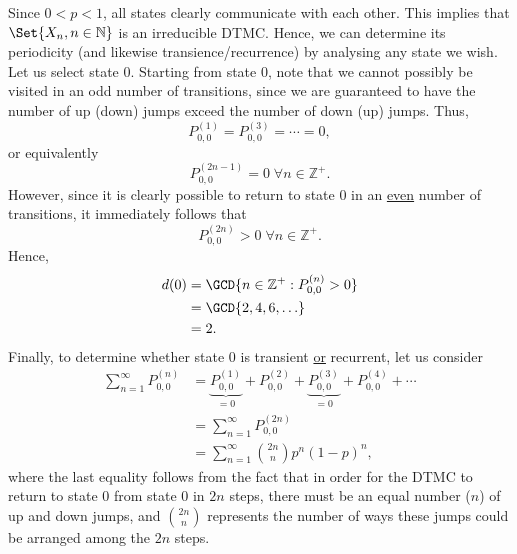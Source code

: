 \begin{Example}
    Since $ 0<p<1 $, all states clearly communicate with
    each other. This implies that $ \Set{X_n,n\in\mathbb{N}} $
    is an irreducible DTMC\@. Hence, we can determine its
    periodicity (and likewise transience/recurrence) by analysing
    any state we wish. Let us select state $0$. Starting from state $0$,
    note that we cannot possibly be visited in an odd number of transitions,
    since we are guaranteed to have the number of up (down) jumps
    exceed the number of down (up) jumps. Thus,
    \[ P_{0,0}^{(1)}=P_{0,0}^{(3)}=\cdots=0, \]
    or equivalently
    \[ P_{0,0}^{(2n-1)}=0\;\forall n\in\mathbb{Z}^+. \]
    However, since it is clearly possible to return to state $ 0 $ in an \underline{even}
    number of transitions, it immediately follows that
    \[ P_{0,0}^{(2n)}>0\;\forall n\in\mathbb{Z}^+. \]
    Hence,
    \begin{align*}
        d(0)
         & =\GCD{n\in\mathbb{Z}^+:P_{0,0}^{(n)}>0} \\
         & =\GCD{2,4,6,\ldots}                     \\
         & =2.
    \end{align*}
    Finally, to determine whether state $ 0 $ is transient \underline{or}
    recurrent, let us consider
    \begin{align*}
        \sum_{n=1}^{\infty} P_{0,0}^{(n)}
         & =\underbrace{P_{0,0}^{(1)}}_{=0}+P_{0,0}^{(2)}+\underbrace{P_{0,0}^{(3)}}_{=0}+P_{0,0}^{(4)}+\cdots \\
         & =\sum_{n=1}^{\infty} P_{0,0}^{(2n)}                                                                 \\
         & =\sum_{n=1}^{\infty} \binom{2n}{n}p^n(1-p)^{n},
    \end{align*}
    where the last equality follows from the fact that in order for
    the DTMC to return to state $ 0 $ from state $ 0 $ in $ 2n $ steps,
    there must be an equal number ($ n $) of up and down jumps,
    and $ \binom{2n}{n} $ represents the number of ways these jumps could be arranged
    among the $ 2n $ steps.


\end{Example}
